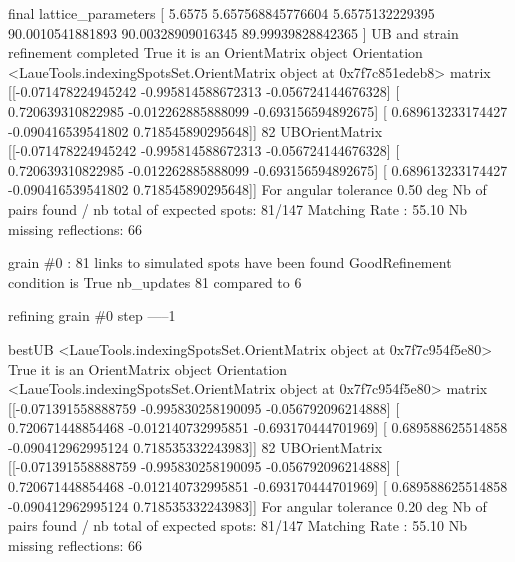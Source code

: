 \documentclass[letterpaper,10pt,english]{sphinxmanual}
\begin{document}
\begin{sphinxalltt}
final lattice\_parameters {[} 5.6575             5.657568845776604  5.6575132229395
 90.0010541881893   90.00328909016345  89.99939828842365 {]}
UB and strain refinement completed
True it is an OrientMatrix object
Orientation \textless{}LaueTools.indexingSpotsSet.OrientMatrix object at 0x7f7c851edeb8\textgreater{}
matrix {[}{[}-0.071478224945242 -0.995814588672313 -0.056724144676328{]}
 {[} 0.720639310822985 -0.012262885888099 -0.693156594892675{]}
 {[} 0.689613233174427 -0.090416539541802  0.718545890295648{]}{]}
 82
UBOrientMatrix {[}{[}-0.071478224945242 -0.995814588672313 -0.056724144676328{]}
 {[} 0.720639310822985 -0.012262885888099 -0.693156594892675{]}
 {[} 0.689613233174427 -0.090416539541802  0.718545890295648{]}{]}
For angular tolerance 0.50 deg
Nb of pairs found / nb total of expected spots: 81/147
Matching Rate : 55.10
Nb missing reflections: 66

grain \#0 : 81 links to simulated spots have been found
GoodRefinement condition is  True
nb\_updates 81 compared to 6


 refining grain \#0 step -----1

bestUB \textless{}LaueTools.indexingSpotsSet.OrientMatrix object at 0x7f7c954f5e80\textgreater{}
True it is an OrientMatrix object
Orientation \textless{}LaueTools.indexingSpotsSet.OrientMatrix object at 0x7f7c954f5e80\textgreater{}
matrix {[}{[}-0.071391558888759 -0.995830258190095 -0.056792096214888{]}
 {[} 0.720671448854468 -0.012140732995851 -0.693170444701969{]}
 {[} 0.689588625514858 -0.090412962995124  0.718535332243983{]}{]}
 82
UBOrientMatrix {[}{[}-0.071391558888759 -0.995830258190095 -0.056792096214888{]}
 {[} 0.720671448854468 -0.012140732995851 -0.693170444701969{]}
 {[} 0.689588625514858 -0.090412962995124  0.718535332243983{]}{]}
For angular tolerance 0.20 deg
Nb of pairs found / nb total of expected spots: 81/147
Matching Rate : 55.10
Nb missing reflections: 66


\end{sphinxalltt}
\end{document}
